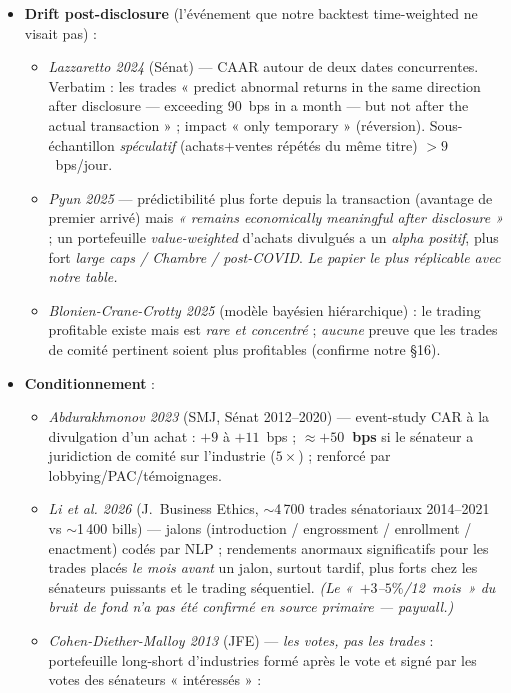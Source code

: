 \documentclass[11pt,a4paper]{article}
\begin{document}
\begin{itemize}
  \item \textbf{Drift post-disclosure} (l'événement que notre backtest time-weighted ne visait pas) :
  \begin{itemize}
    \item \emph{Lazzaretto 2024} (Sénat) --- CAAR autour de deux dates concurrentes. Verbatim : les trades
    « predict abnormal returns in the same direction after disclosure --- exceeding 90~bps in a month --- but
    not after the actual transaction » ; impact « only temporary » (réversion). Sous-échantillon
    \emph{spéculatif} (achats+ventes répétés du même titre) $> 9$~bps/jour.
    \item \emph{Pyun 2025} --- prédictibilité plus forte depuis la transaction (avantage de premier arrivé)
    mais \emph{« remains economically meaningful after disclosure »} ; un portefeuille \emph{value-weighted}
    d'achats divulgués a un \emph{alpha positif}, plus fort \emph{large caps / Chambre / post-COVID}. \emph{Le
    papier le plus réplicable avec notre table.}
    \item \emph{Blonien-Crane-Crotty 2025} (modèle bayésien hiérarchique) : le trading profitable existe mais
    est \emph{rare et concentré} ; \emph{aucune} preuve que les trades de comité pertinent soient plus
    profitables (confirme notre §16).
  \end{itemize}
  \item \textbf{Conditionnement} :
  \begin{itemize}
    \item \emph{Abdurakhmonov 2023} (SMJ, Sénat 2012--2020) --- event-study CAR à la divulgation d'un achat :
    $+9$ à $+11$~bps ; \textbf{$\approx +50$~bps} si le sénateur a juridiction de comité sur l'industrie
    ($5\times$) ; renforcé par lobbying/PAC/témoignages.
    \item \emph{Li \textit{et al.} 2026} (J.~Business Ethics, $\sim$4\,700 trades sénatoriaux 2014--2021 vs
    $\sim$1\,400 bills) --- jalons (introduction / engrossment / enrollment / enactment) codés par NLP ;
    rendements anormaux significatifs pour les trades placés \emph{le mois avant} un jalon, surtout tardif,
    plus forts chez les sénateurs puissants et le trading séquentiel. \emph{(Le «~$+3$--$5\%$/12~mois~» du
    bruit de fond n'a pas été confirmé en source primaire --- paywall.)}
    \item \emph{Cohen-Diether-Malloy 2013} (JFE) --- \emph{les votes, pas les trades} : portefeuille
    long-short d'industries formé après le vote et signé par les votes des sénateurs « intéressés » :

\end{itemize}
\end{itemize}
\end{document}
